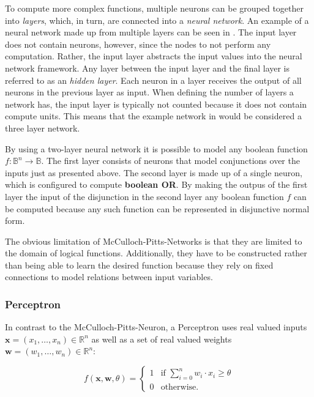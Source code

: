 To compute more complex functions, multiple neurons can be grouped together into \textit{layers}, which, in turn, are connected into a \textit{neural network}.
An example of a neural network made up from multiple layers can be seen in .
The input layer does not contain neurons, however, since the nodes to not perform any computation.
Rather, the input layer abstracts the input values into the neural network framework.
Any layer between the input layer and the final layer is referred to as an \textit{hidden layer}.
Each neuron in a layer receives the output of all neurons in the previous layer as input.
When defining the number of layers a network has, the input layer is typically not counted because it does not contain compute units.
This means that the example network in  would be considered a three layer network.

By using a two-layer neural network it is possible to model any boolean function $f: \mathbb{B}^n \to \mathbb{B}$.
The first layer consists of neurons that model conjunctions over the inputs just as presented above.
The second layer is made up of a single neuron, which is configured to compute \textbf{boolean OR}.
By making the outpus of the first layer the input of the disjunction in the second layer any boolean function $f$ can be computed because any such function can be represented in disjunctive normal form.

The obvious limitation of McCulloch-Pitts-Networks is that they are limited to the domain of logical functions.
Additionally, they have to be constructed rather than being able to learn the desired function because they rely on fixed connections to model relations between input variables.

\subsubsection{Perceptron}

In contrast to the McCulloch-Pitts-Neuron, a Perceptron uses real valued inputs $\bm{x} = (x_1, \dots, x_n) \in \mathbb{R}^n$ as well as a set of real valued weights $\bm{w} = (w_1, \dots, w_n) \in \mathbb{R}^n$:

\begin{equation}
    f(\bm{x}, \bm{w}, \theta) =
    \begin{cases}
        1 & \text{if } \sum_{i=0}^n w_i \cdot x_i \geq \theta \\
        0 & \text{otherwise.}
    \end{cases}
\end{equation}

